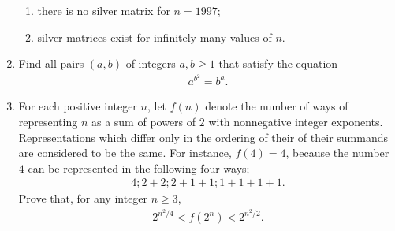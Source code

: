 \documentclass{article}
\begin{document}
\begin{enumerate}
\begin{enumerate}
\item there is no silver matrix for $n=1997$;
\item silver matrices exist for infinitely many values of $n$.
\end{enumerate}
\item Find all pairs $(a,b)$ of integers $a,b \geq 1$ that satisfy the equation 
\begin{align}
a^{b^2}=b^{a}.
\end{align}
\item For each positive integer $n$, let $f(n)$ denote the number of ways of representing $n$ as a sum of powers of $2$ with nonnegative integer exponents. Representations which differ only in the ordering of their of their summands are considered to be the same. For instance, $f(4)=4$, because the number $4$ can be represented in the following four ways;
\begin{align}
4;2 + 2;2 + 1 + 1;1 + 1 + 1 + 1.
\end{align}
Prove that, for any integer $n \geq{3}$,
\begin{align}
2^{n^2/4} < f(2^n)<2^{n^2/2}.
\end{align}
\end{enumerate}
\end{document}
